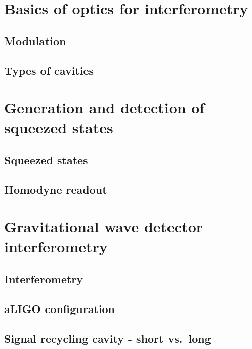 \documentclass[aps,pra,superscriptaddress,reprint,nofootinbib]{revtex4-1}
\begin{document}
\section{Basics of optics for interferometry}

\subsection{Modulation}

\subsection{Types of cavities}


\section{Generation and detection of squeezed states}

\subsection{Squeezed states}


\subsection{Homodyne readout}



\section{Gravitational wave detector interferometry}

\subsection{Interferometry}

\subsection{aLIGO configuration}

\subsection{Signal recycling cavity - short vs.\ long}
\end{document}
